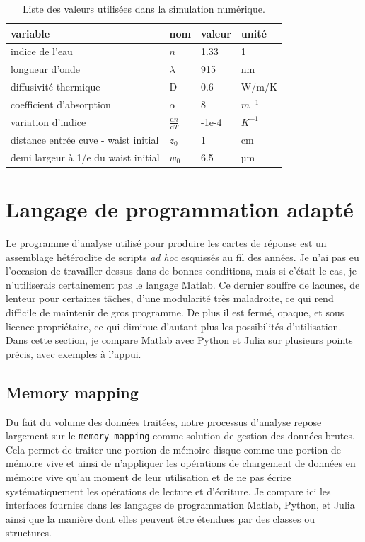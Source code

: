 \begin{table}[h!]
    \centering
    \begin{tabular}{|l|l|l|l|}
        \hline
        \textbf{variable} & \textbf{nom} & \textbf{valeur} & \textbf{unité}\\
        \hline
        indice de l'eau & $n$ & 1.33 & 1 \\
        longueur d'onde & $\lambda$ & 915 & nm \\
        diffusivité thermique & D & 0.6 & W/m/K \\
        coefficient d'absorption & $\alpha$ & 8 & $m^{-1}$ \\
        variation d'indice & $\frac{\mathrm{d}n}{\mathrm{d}T}$ & -1e-4 & $K^{-1}$ \\
        distance entrée cuve - waist initial & $z_0$ & 1 & cm \\
        demi largeur à 1/e du waist initial & $w_0$ & 6.5 & µm \\
        \hline
    \end{tabular}
    \caption{Liste des valeurs utilisées dans la simulation numérique. \label{paramvalue}}
\end{table}

\section{Langage de programmation adapté}\label{langageadapte}

Le programme d'analyse utilisé pour produire les cartes de réponse est un assemblage hétéroclite de scripts \emph{ad hoc} esquissés au fil des années. Je n'ai pas eu l'occasion de travailler dessus dans de bonnes conditions, mais si c'était le cas, je n'utiliserais certainement pas le langage Matlab. Ce dernier souffre de lacunes, de lenteur pour certaines tâches, d'une modularité très maladroite, ce qui rend difficile de maintenir de gros programme. De plus il est fermé, opaque, et sous licence propriétaire, ce qui diminue d'autant plus les possibilités d'utilisation. Dans cette section, je compare Matlab avec Python et Julia sur plusieurs points précis, avec exemples à l'appui.

\subsection{Memory mapping}

Du fait du volume des données traitées, notre processus d'analyse repose largement sur le \verb|memory mapping| comme solution de gestion des données brutes. Cela permet de traiter une portion de mémoire disque comme une portion de mémoire vive et ainsi de n'appliquer les opérations de chargement de données en mémoire vive qu'au moment de leur utilisation et de ne pas écrire systématiquement les opérations de lecture et d'écriture. Je compare ici les interfaces fournies dans les langages de programmation Matlab, Python, et Julia ainsi que la manière dont elles peuvent être étendues par des classes ou structures.

